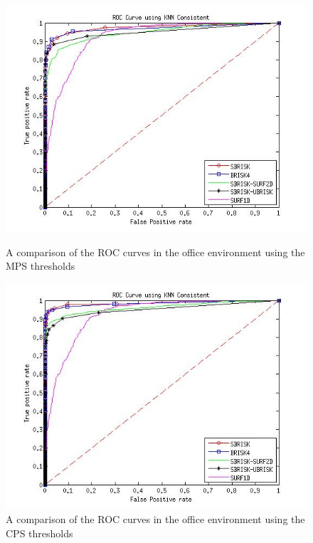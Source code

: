 \documentclass{report}
\begin{document}
\begin{figure}[h!]
\begin{minipage}[b]{0.5\linewidth}
\includegraphics[scale=0.4]{../Drawings/dataset2_ROC_General_KNN.jpg}
\caption{A comparison of the ROC curves in the office environment using the MPS thresholds}
\label{fig:compareKnnOffice}
\end{minipage}
\hspace{0.5cm}
\begin{minipage}[b]{0.5\linewidth}
\includegraphics[scale=0.4]{../Drawings/dataset2_ROC_General_KNN_Consistent.jpg}
\caption{A comparison of the ROC curves in the office environment using the CPS thresholds}
\label{fig:compareKnnConsistentOffice}
\end{minipage}

\end{figure}
\end{document}
